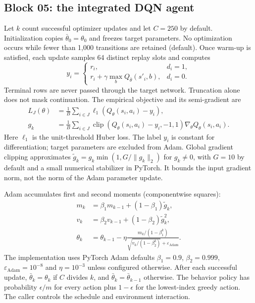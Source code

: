 \documentclass[11pt,a4paper]{article}
\begin{document}
\subsection{Block 05: the integrated DQN agent}
Let $k$ count successful optimizer updates and let $C=250$ by default.
Initialization copies $\bar\theta_0=\theta_0$ and freezes target parameters.
No optimization occurs while fewer than 1,000 transitions are retained (default).
Once warm-up is satisfied, each update samples 64 distinct replay slots and computes
\[
y_i=\begin{cases}r_i,&d_i=1,\\
r_i+\gamma\max_b Q_{\bar\theta}(s'_i,b),&d_i=0.\end{cases}
\]
Terminal rows are never passed through the target network. Truncation alone does
not mask continuation. The empirical objective and its semi-gradient are
\begin{align*}
L_J(\theta)&=\frac1B\sum_{i\in J}\ell_1(Q_\theta(s_i,a_i)-y_i),\\
g_k&=\frac1B\sum_{i\in J}\operatorname{clip}(Q_\theta(s_i,a_i)-y_i,-1,1)
\nabla_\theta Q_\theta(s_i,a_i).
\end{align*}
Here $\ell_1$ is the unit-threshold Huber loss. The label $y_i$ is constant
for differentiation; target parameters are excluded from Adam. Global gradient
clipping approximates $\tilde g_k=g_k\min(1,G/\|g_k\|_2)$ for $g_k\ne0$,
with $G=10$ by default and a small numerical stabilizer in PyTorch. It bounds the
input gradient norm, not the norm of the Adam parameter update.

Adam accumulates first and second moments (componentwise squares):
\begin{align*}
m_k&=\beta_1m_{k-1}+(1-\beta_1)\tilde g_k,\\
v_k&=\beta_2v_{k-1}+(1-\beta_2)\tilde g_k^2,\\
\theta_k&=\theta_{k-1}-\eta\frac{m_k/(1-\beta_1^k)}
{\sqrt{v_k/(1-\beta_2^k)}+\varepsilon_{\mathrm{Adam}}}.
\end{align*}
The implementation uses PyTorch Adam defaults $\beta_1=0.9$, $\beta_2=0.999$,
$\varepsilon_{\mathrm{Adam}}=10^{-8}$ and $\eta=10^{-3}$ unless configured
otherwise. After each successful update, $\bar\theta_k=\theta_k$ if $C$ divides
$k$, and $\bar\theta_k=\bar\theta_{k-1}$ otherwise. The behavior policy has
probability $\epsilon/m$ for every action plus $1-\epsilon$ for the lowest-index
greedy action. The caller controls the schedule and environment interaction.
\end{document}
